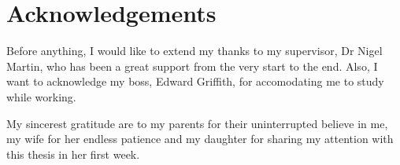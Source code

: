 \chapter*{Acknowledgements}

Before anything, I would like to extend my thanks to my supervisor, Dr Nigel Martin, who has been a great support from the very start to the end. Also, I want to acknowledge my boss, Edward Griffith, for accomodating me to study while working.

My sincerest gratitude are to my parents for their uninterrupted believe in me, my wife for her endless patience and my daughter for sharing my attention with this thesis in her first week.
